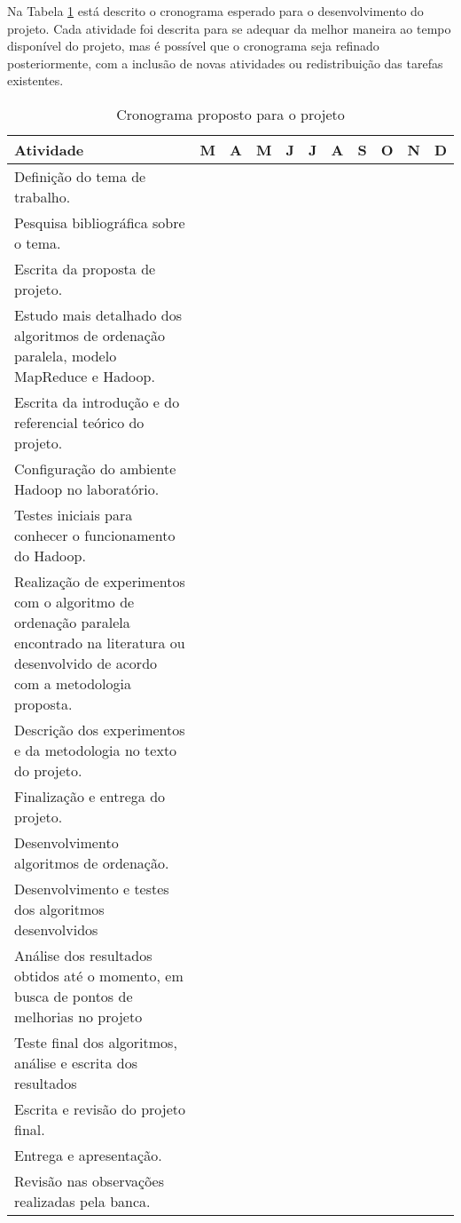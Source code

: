 Na Tabela \ref{tab:cronograma} está descrito o cronograma esperado para o desenvolvimento do projeto. Cada atividade foi descrita para se adequar da melhor maneira ao tempo disponível do projeto, mas é possível que o cronograma seja refinado posteriormente, com a inclusão de novas atividades ou redistribuição das tarefas existentes. 

\begin{table}[h]
\begin{center}
\renewcommand{\arraystretch}{1.5}
\setlength\tabcolsep{3pt}

\begin{tabular}{| p{8cm} | p{0.5cm} | p{0.5cm} | p{0.5cm} | p{0.5cm} | p{0.5cm} | p{0.5cm} | p{0.5cm} | p{0.5cm} | p{0.5cm} | p{0.5cm} |}
\hline
Atividade &M &A &M &J &J &A &S &O &N &D \\ \hline \hline
Definição do tema de trabalho. & & & & & & & & & & \\ \hline
Pesquisa bibliográfica sobre o tema.  & & & & & & & & & &\\ \hline
Escrita da proposta de projeto.  & & & & & & & & & & \\ \hline
Estudo mais detalhado dos algoritmos de ordenação paralela,  modelo MapReduce e Hadoop.  & & & & & & & & & &\\ \hline
Escrita da introdução e do referencial teórico do projeto.  & & & & & & & & & &\\ \hline
Configuração do ambiente Hadoop no laboratório.  & & & & & & & & & &\\ \hline
Testes iniciais para conhecer o funcionamento do Hadoop.  & & & & & & & & & &\\ \hline
Realização de experimentos com o algoritmo de ordenação paralela encontrado na literatura ou desenvolvido de acordo com a metodologia proposta.  & & & & & & & & & &\\ \hline
Descrição dos experimentos e da metodologia no texto do projeto.  & & & & & & & & & & \\ \hline
Finalização e entrega do projeto.  & & & & & & & & & &\\ \hline
Desenvolvimento  algoritmos de ordenação. & & & & & & & & & & \\ \hline
Desenvolvimento e testes dos algoritmos desenvolvidos  & & & & & & & & & & \\ \hline
Análise dos resultados obtidos até o momento, em busca de pontos de melhorias no projeto  & & & & & & & & & & \\ \hline
Teste final dos algoritmos, análise e escrita dos resultados  & & & & & & & & & & \\ \hline
Escrita e revisão do projeto final.  & & & & & & & & & &\\ \hline
Entrega e apresentação.  & & & & & & & & & & \\ \hline
Revisão nas observações realizadas pela banca.  & & & & & & & & & &\\ \hline
\hline
\end{tabular}

\caption{Cronograma proposto para o projeto}
\end{center}
\label{tab:cronograma}
\end{table}


